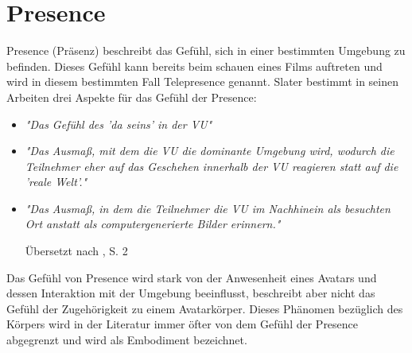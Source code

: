 \section{Presence}
Presence (Präsenz) beschreibt das Gefühl, sich in einer bestimmten Umgebung zu befinden. Dieses Gefühl kann bereits beim schauen eines Films auftreten und wird in diesem bestimmten Fall Telepresence genannt.
Slater bestimmt in seinen Arbeiten \cite{Slater2003}\cite{Slater1999} drei Aspekte für das Gefühl der Presence:

\begin{itemize}

\item \textit{"Das Gefühl des 'da seins' in der VU"}
\item \textit{"Das Ausmaß, mit dem die VU die dominante Umgebung wird, wodurch die Teilnehmer eher auf das Geschehen innerhalb der VU reagieren statt auf die 'reale Welt'."}
\item \textit{"Das Ausmaß, in dem die Teilnehmer die VU im Nachhinein als besuchten Ort anstatt als computergenerierte Bilder erinnern."}

Übersetzt nach \cite{Slater1999}, S. 2
\end{itemize}

Das Gefühl von Presence wird stark von der Anwesenheit eines Avatars und dessen Interaktion mit der Umgebung beeinflusst, beschreibt aber nicht das Gefühl der Zugehörigkeit zu einem Avatarkörper. Dieses Phänomen bezüglich des Körpers wird in der Literatur immer öfter von dem Gefühl der Presence abgegrenzt und wird als Embodiment bezeichnet.

